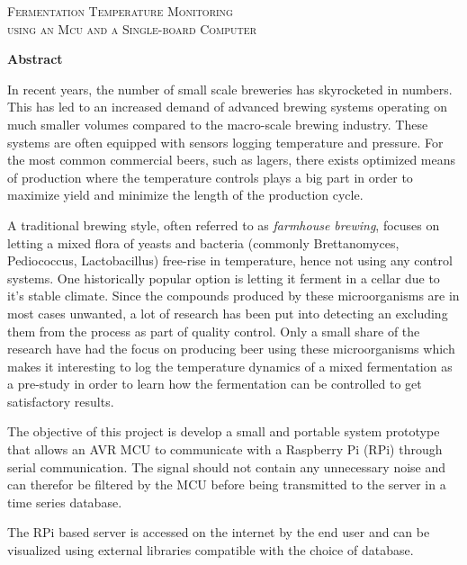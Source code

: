 \thispagestyle{plain}
\begin{center}
    \Large
    \textsc{Fermentation Temperature Monitoring}
    \vspace{0.1cm}
    \small \\
    \textsc{using an Mcu and a Single-board Computer}
        
    \vspace{0.4cm}
    
       
    \vspace{0.9cm}
    \textbf{Abstract}
\end{center}
In recent years, the number of small scale breweries has skyrocketed in numbers. This has led to an increased demand of advanced brewing systems operating on much smaller volumes compared to the macro-scale brewing industry. These systems are often equipped with sensors logging temperature and pressure. For the most common commercial beers, such as lagers, there exists optimized means of production where the temperature controls plays a big part in order to maximize yield and minimize the length of the production cycle.

A traditional brewing style, often referred to as 
\textit{farmhouse brewing}, focuses on letting a mixed flora of yeasts and bacteria (commonly Brettanomyces, Pediococcus, Lactobacillus) free-rise in temperature, hence not using any control systems. One historically popular option is letting it ferment in a cellar due to it's stable climate. Since the compounds produced by these microorganisms are in most cases unwanted, a lot of research has been put into detecting an excluding them from the process as part of quality control. Only a small share of the research have had the focus on producing beer using these microorganisms which makes it interesting to log the temperature dynamics of a mixed fermentation as a pre-study in order to learn how the fermentation can be controlled to get satisfactory results.

The objective of this project is develop a small and portable system prototype that allows an AVR MCU to communicate with a Raspberry Pi (RPi) through serial communication. The signal should not contain any unnecessary noise and can therefor be filtered by the MCU before being transmitted to the server in a time series database.

The RPi based server is accessed on the internet by the end user and can be visualized using external libraries compatible with the choice of database.
\restoregeometry
